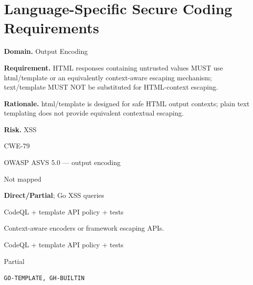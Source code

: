 \documentclass[10pt,letterpaper]{article}
\newcommand{\prioritybadge}[2]{\tcbox[on line,boxrule=0pt,arc=1.2mm,boxsep=0.7mm,left=1mm,right=1mm,top=0.4mm,bottom=0.4mm,colback=#2!12,coltext=#2]{\scriptsize\bfseries #1}}
\begin{document}
\section{Language-Specific Secure Coding Requirements}
\begin{rulebox}[title={\texttt{SCS-GO-OUTPUT-001} \hfill \prioritybadge{High Priority}{High}}]
\textbf{Domain.} Output Encoding

\textbf{Requirement.} HTML responses containing untrusted values MUST use html/template or an equivalently context-aware escaping mechanism; text/template MUST NOT be substituted for HTML-context escaping.

\textbf{Rationale.} html/template is designed for safe HTML output contexts; plain text templating does not provide equivalent contextual escaping.

\textbf{Risk.} XSS

\begin{description}[leftmargin=2.65cm,labelwidth=2.3cm,style=nextline,itemsep=1pt,topsep=3pt]
  \item[CWE] CWE-79
  \item[OWASP] OWASP ASVS 5.0 --- output encoding
  \item[CERT] Not mapped
  \item[CodeQL] \textbf{Direct/Partial}; Go XSS queries
  \item[Enforcement] CodeQL + template API policy + tests
  \item[Prevention] Context-aware encoders or framework escaping APIs.
  \item[Verification] CodeQL + template API policy + tests
  \item[Automation] Partial
  \item[Sources] \texttt{GO-TEMPLATE, GH-BUILTIN}
\end{description}
\end{rulebox}
\end{document}
